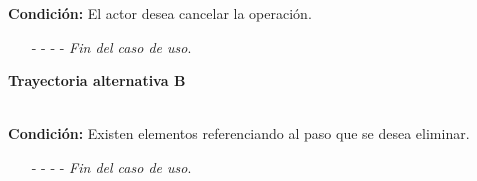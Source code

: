 \noindent \textbf{Condición:} El actor desea cancelar la operación.
\begin{enumerate}
	\UCpaso[\UCactor] Oprime el botón  de la pantalla emergente.
	\UCpaso[\UCsist] Muestra la pantalla  o .
	\item[- -] - - {\em {Fin del caso de uso}}.%
\end{enumerate}
\hypertarget{CU12-1-1-1-3:TAB}{\textbf{Trayectoria alternativa B}}\\
\noindent \textbf{Condición:} Existen elementos referenciando al paso que se desea eliminar.
\begin{enumerate}
	\UCpaso[\UCsist] Muestra el mensaje  en la pantalla  o  en una pantalla emergente con la lista elementos que están referenciando al paso.
	\UCpaso[\UCactor] Oprime el botón  de la pantalla emergente.
	\UCpaso[\UCsist] Muestra la pantalla  o .
	\item[- -] - - {\em {Fin del caso de uso}}.
\end{enumerate}
	

